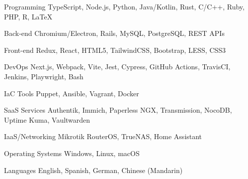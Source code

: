 

\begin{cvskills}

  \cvskill
    {Programming} %
    {TypeScript, Node.js, Python, Java/Kotlin, Rust, C/C++, Ruby, PHP, R, LaTeX} %

  \cvskill
    {Back-end} %
    {Chromium/Electron, Rails, MySQL, PostgreSQL, REST APIs} %

  \cvskill
    {Front-end} %
    {Redux, React, HTML5, TailwindCSS, Bootstrap, LESS, CSS3} %

  \cvskill
    {DevOps} %
    {Next.js, Webpack, Vite, Jest, Cypress, GitHub Actions, TravisCI, Jenkins, Playwright, Bash} %

  \cvskill
    {IaC Tools} %
    {Puppet, Ansible, Vagrant, Docker} %

  \cvskill
    {SaaS Services} %
    {Authentik, Immich, Paperless NGX, Transmission, NocoDB, Uptime Kuma, Vaultwarden} %

  \cvskill
    {IaaS/Networking} %
    {Mikrotik RouterOS, TrueNAS, Home Assistant} %
    
  \cvskill
    {Operating Systems} %
    {Windows, Linux, macOS} %

  \cvskill
    {Languages} %
    {English, Spanish, German, Chinese (Mandarin)} %

\end{cvskills}
